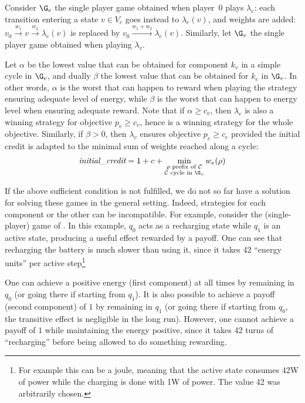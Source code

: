 Consider $\G_e$ the single player game obtained when player~0 plays $\lambda_e$: each transition entering a state $v \in V_c$ goes instead to $\lambda_e(v)$, and weights are added: $v_0 \xrightarrow{w_1} v \xrightarrow{w_2} \lambda_e(v)$ is replaced by $v_0 \xrightarrow{w_1+w_2} \lambda_e(v)$.
Similarly, let $\G_v$ the single player game obtained when playing $\lambda_v$.

Let $\alpha$ be the lowest value that can be obtained for component $k_v$ in a simple cycle in $\G_e$, and dually $\beta$ the lowest value that can be obtained for $k_e$ in $\G_v$.
In other words, $\alpha$ is the worst that can happen to reward when playing the strategy ensuring adequate level of energy, while $\beta$ is the worst that can happen to energy level when ensuring adequate reward.
Note that if $\alpha \geq c_v$, then $\lambda_e$ is also a winning strategy for objective $p_v \geq c_v$, hence is a winning strategy for the whole objective.
Similarly, if $\beta > 0$, then $\lambda_v$ ensures objective $p_e \geq c_e$ provided the initial credit is adapted to the minimal sum of weights reached along a cycle:
\[\textit{initial\_credit} = 1+c+\min_{\substack{\rho \textrm{ prefix of } \mathcal{C}\\  \mathcal{C}\textrm{ cycle in } \G_v}} w_e(\rho)\]

\medskip

If the above sufficient condition is not fulfilled, we do not so far have a solution for solving these games in the general setting.
Indeed, strategies for each component or the other can be incompatible.
For example, consider the (single-player) game of .
In this example, $q_0$ acts as a recharging state while $q_1$ is an active state, producing a useful effect rewarded by a payoff.
One can see that recharging the battery is much slower than using it, since it takes 42 ``energy units'' per active step\footnote{For example this can be a joule, meaning that the active state consumes 42W of power while the charging is done with 1W of power. The value 42 was arbitrarily chosen.}

One can achieve a positive energy (first component) at all times by remaining in $q_0$ (or going there if starting from $q_1$).
It is also possible to achieve a payoff (second component) of $1$ by remaining in $q_1$ (or going there if starting from $q_0$, the transitive effect is negligible in the long run).
However, one cannot achieve a payoff of $1$ while maintaining the energy positive, since it takes 42 turns of ``recharging'' before being allowed to do something rewarding.

